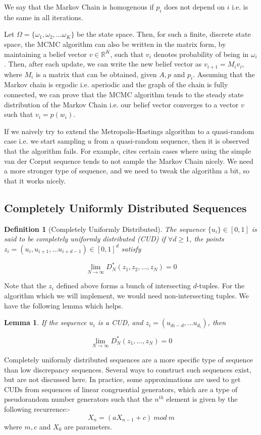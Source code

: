 \documentclass[12pt,letterpaper, twoside]{article}
\newtheorem{lemma}{Lemma}
\newtheorem{definition}{Definition}
\theoremstyle{definition}
\begin{document}
We say that the Markov Chain is homogenous if $p_i$ does not depend on $i$ i.e. is the same in all iterations.

Let $\Omega = \{\omega_1,\omega_2,\ldots \omega_K\}$ be the state space. Then, for such a finite, discrete state space, the MCMC algorithm can also be written in the matrix form, by maintaining a belief vector $v \in \mathbb{R}^K$, such that $v_i$ denotes probability of being in $\omega_i$. Then, after each update, we can write the new belief vector as $v_{i+1} = M_iv_i$, where $M_i$ is a matrix that can be obtained, given $A,p$ and $p_i$. Assuming that the Markov chain is ergodic i.e. aperiodic and the graph of the chain is fully connected, we can prove that the MCMC algorithm tends to the steady state distribution of the Markov Chain i.e. our belief vector converges to a vector $v$ such that $v_i = p(w_i)$.

If we naively try to extend the Metropolis-Hastings algorithm to a quasi-random case i.e. we start sampling $u$ from a quasi-random sequence, then it is observed that the algorithm fails. For example, \cite{owenReport} cites certain cases where using the simple van der Corput sequence tends to not sample the Markov Chain nicely. We need a more stronger type of sequence, and we need to tweak the algorithm a bit, so that it works nicely. 

\subsection{Completely Uniformly Distributed Sequences}
\begin{definition}[Completely Uniformly Distributed]\cite{owenReport}
The sequence $\{u_i\}\in[0,1]$  is said to be completely uniformly distributed (CUD) if $\forall d \geq 1$, the points $z_i = (u_i,u_{i+1},\ldots u_{i+d-1}) \in [0,1]^d$ satisfy

$$
\lim_{N \to \infty} D_N^*(z_1,z_2,\ldots,z_N) = 0
$$

\end{definition}

Note that the $z_i$ defined above forms a bunch of intersecting $d$-tuples. For the algorithm which we will implement, we would need non-intersecting tuples. We have the following lemma \cite{lemma1Book} which helps.

\begin{lemma}
If the sequence ${u_i}$ is a CUD, and $z_i = (u_{di-d},\ldots u_{d_i})$, then 

$$
\lim_{N \to \infty} D_N^*(z_1,\ldots,z_N) = 0
$$
\end{lemma}
Completely uniformly distributed sequences are a more specific type of sequence than low discrepancy sequences. Several ways to construct such sequences exist, but are not discussed here. In practice, some approximations are used to get CUDs from sequences of linear congruential generators, which are a type of pseudorandom number generators such that the $n^{th}$ element is given by the following recurrence:-
$$
X_{n} = (aX_{n-1} + c) \ mod \ m
$$ where $m,c$ and $X_0$ are parameters.
\end{document}
